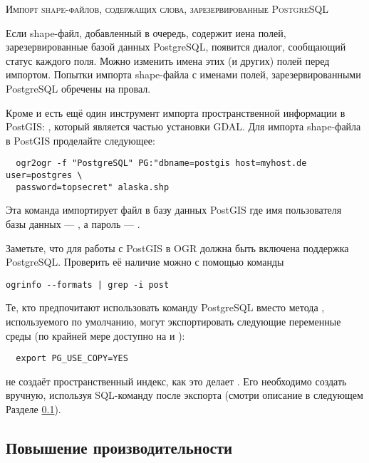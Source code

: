 \begin{Tip}\caption{\textsc{Импорт shape-файлов, содержащих
слова, зарезервированные PostgreSQL}}
Если shape-файл, добавленный в очередь, содержит иена полей, зарезервированные
базой данных PostgreSQL, появится диалог, сообщающий статус
каждого поля. Можно изменить имена этих (и других) полей
перед импортом. Попытки
импорта shape-файла с именами полей, зарезервированными PostgreSQL обречены на провал.
\end{Tip}

Кроме  и  есть ещё один инструмент импорта пространственной информации
в PostGIS: , который является частью установки GDAL.
Для импорта shape-файла в PostGIS проделайте следующее:
\begin{verbatim}
  ogr2ogr -f "PostgreSQL" PG:"dbname=postgis host=myhost.de user=postgres \
  password=topsecret" alaska.shp
\end{verbatim}

Эта команда импортирует файл  в базу данных PostGIS
\usertext{postgis}
где имя пользователя базы данных --- , а пароль --- 
\server{myhost.de}.

Заметьте, что для работы с PostGIS в OGR должна быть включена поддержка PostgreSQL.
Проверить её наличие можно с помощью команды
\begin{verbatim}
ogrinfo --formats | grep -i post
\end{verbatim}

Те, кто предпочитают использовать команду PostgreSQL  вместо метода
\filename{INSERT INTO}, используемого по умолчанию, могут экспортировать следующие
переменные среды %
(по крайней мере доступно на \nix и \osx):
\begin{verbatim}
  export PG_USE_COPY=YES
\end{verbatim}

 не создаёт пространственный индекс, как это делает .
Его необходимо создать вручную, используя SQL-команду
 после экспорта (смотри описание в следующем
Разделе \ref{label_improve}).

\subsection{Повышение производительности} \label{label_improve}

